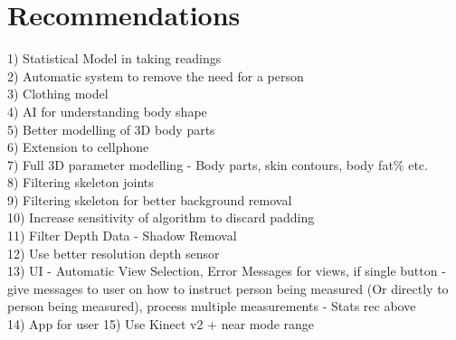 \chapter{Recommendations} \label{recommendations}

1) Statistical Model in taking readings\\
2) Automatic system to remove the need for a person\\
3) Clothing model\\
4) AI for understanding body shape\\
5) Better modelling of 3D body parts\\
6) Extension to cellphone\\
7) Full 3D parameter modelling - Body parts, skin contours, body fat\% etc.\\
8) Filtering skeleton joints\\
9) Filtering skeleton for better background removal\\
10) Increase sensitivity of algorithm to discard padding\\
11) Filter Depth Data - Shadow Removal\\
12) Use better resolution depth sensor\\
13) UI - Automatic View Selection, Error Messages for views, if single button - give messages to user on how to instruct person being measured (Or directly to person being measured), process multiple measurements - Stats rec above\\ 
14) App for user
15) Use Kinect v2 + near mode range
